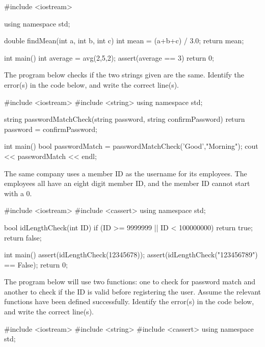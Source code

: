 {%
    #include <iostream>
    
    using namespace std;
    
    double findMean(int a, int b, int c)
    {
        int mean = (a+b+c) / 3.0;
        return mean;
    }
    
    int main()
    {
        int average = avg(2,5,2);
        assert(average == 3)
        return 0;
    }
{%

\begin{multipart}
The program below checks if the two strings given are the same. Identify the error(s) in the code below, and write the correct line(s).
\end{multipart}

{%
    #include <iostream>
    #include <string>
    using namespace std;
    
    string passwordMatchCheck(string password, string confirmPassword) 
    {
        return password = confirmPassword;
    }
    
    int main()
    {
       bool passwordMatch = passwordMatchCheck('Good',"Morning");
       cout << passwordMatch << endl;
    }
{%

\begin{multipart}
 The same company uses a member ID as the username for its employees. The employees all have an eight digit member ID, and the member ID cannot start with a 0.
\end{multipart}

{%
#include <iostream>
#include <cassert>
using namespace std;

bool idLengthCheck(int ID) 
{
    if (ID >= 9999999 || ID < 100000000)
    {
        return true;
    }
    return false;
}

int main()
{
    assert(idLengthCheck(12345678));
    assert(idLengthCheck("123456789") == False);
    return 0;
}
{%

\begin{multipart}
The program below will use two functions: one to check for password match and another to check if the ID is valid before registering the user. Assume the relevant functions have been defined successfully. Identify the error(s) in the code below, and write the correct line(s).
\end{multipart}

{%
#include <iostream>
#include <string>
#include <cassert>
using namespace std;

}}}}}}}
